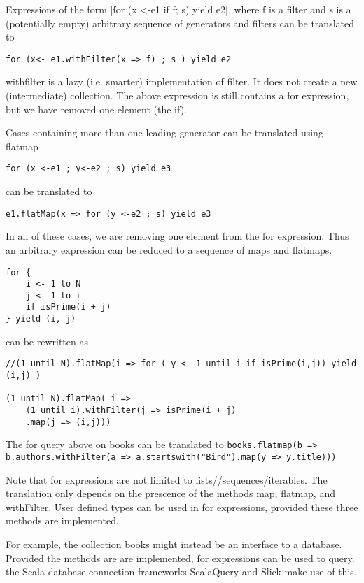 Expressions of the form \lstlinline|for (x <-e1 if f; s) yield e2|, where f is a filter and s is a (potentially empty) arbitrary sequence of generators and filters can be translated to 
\begin{lstlisting}
for (x<- e1.withFilter(x => f) ; s ) yield e2
\end{lstlisting}
withfilter is a lazy (i.e. smarter) implementation of filter. It does not create a new (intermediate) collection. The above expression is still contains a for expression, but we have removed one element (the if).

Cases containing more than one leading generator can be translated using flatmap
\begin{lstlisting}
for (x <-e1 ; y<-e2 ; s) yield e3
\end{lstlisting}
can be translated to 
\begin{lstlisting}
e1.flatMap(x => for (y <-e2 ; s) yield e3
\end{lstlisting}

In all of these cases, we are removing one element from the for expression. Thus an arbitrary expression can be reduced to a sequence of maps and flatmaps.

\begin{lstlisting}
for { 
	i <- 1 to N
	j <- 1 to i
	if isPrime(i + j)
} yield (i, j)
\end{lstlisting}

can be rewritten as
\begin{lstlisting}
//(1 until N).flatMap(i => for ( y <- 1 until i if isPrime(i,j)) yield (i,j) )

(1 until N).flatMap( i => 
	(1 until i).withFilter(j => isPrime(i + j)
	.map(j => (i,j)))
\end{lstlisting}

The for query above on books can be translated to \lstinline|books.flatmap(b => b.authors.withFilter(a => a.startswith("Bird").map(y => y.title)))|

Note that for expressions are not limited to lists//sequences/iterables. The translation only depends on the prescence of the methods map, flatmap, and withFilter. User defined types can be used in for expressions, provided these three methods are implemented.

For example, the collection books might instead be an interface to a database. Provided the methods are are implemented, for expressions can be used to query. the Scala database connection frameworks ScalaQuery and Slick make use of this.

